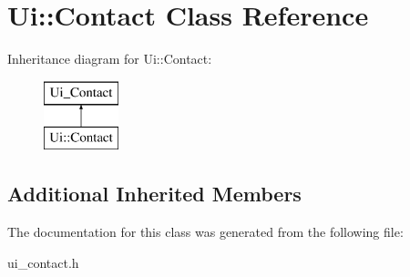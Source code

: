 \hypertarget{class_ui_1_1_contact}{}\section{Ui\+:\+:Contact Class Reference}
\label{class_ui_1_1_contact}
Inheritance diagram for Ui\+:\+:Contact\+:\begin{figure}[H]
\begin{center}
\leavevmode
\includegraphics[height=2.000000cm]{class_ui_1_1_contact}
\end{center}
\end{figure}
\subsection*{Additional Inherited Members}


The documentation for this class was generated from the following file\+:\begin{DoxyCompactItemize}
\item 
ui\+\_\+contact.\+h\end{DoxyCompactItemize}
